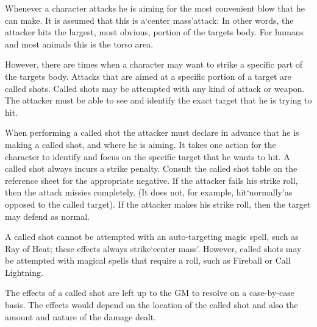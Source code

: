 \documentclass[twoside]{book}
\begin{document}
    {  
    Whenever a character attacks he is aiming for the most convenient blow that he can make. It is assumed that this is a`center mass'attack: In other words, the attacker hits the largest, most obvious, portion of the targets body. For humans and most animals this is the torso area.
    }
  
    {  
    However, there are times when a character may want to strike a specific part of the targets body. Attacks that are aimed at a specific portion of a target are called shots. Called shots may be attempted with any kind of attack or weapon. The attacker must be able to see and identify the exact target that he is trying to hit.
    }
  
    {  
    When performing a called shot the attacker must declare in advance that he is making a called shot, and where he is aiming. It takes one action for the character to identify and focus on the specific target that he wants to hit. A called shot always incurs a strike penalty. Consult the called shot table on the reference sheet for the appropriate negative. If the attacker fails his strike roll, then the attack missies completely. (It does not, for example, hit`normally'as opposed to the called target). If the attacker makes his strike roll, then the target may defend as normal.
    }
  
    {  
    A called shot cannot be attempted with an auto-targeting magic spell, such as Ray of Heat; these effects always strike`center mass'. However, called shots may be attempted with magical spells that require a roll, such as Fireball or Call Lightning.
    }
  
    {  
    The effects of a called shot are left up to the GM to resolve on a case-by-case basis. The effects would depend on the location of the called shot and also the amount and nature of the damage dealt.
    }
  
  

  

  
  

  
\end{document}
